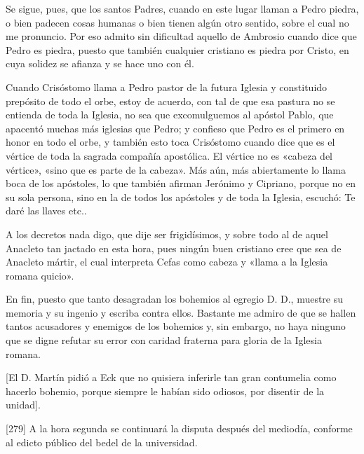 Se sigue, pues, que los santos Padres, cuando en este lugar llaman a Pedro piedra, o bien padecen cosas humanas o bien tienen algún otro sentido, sobre el cual no me pronuncio. Por eso admito sin dificultad aquello de Ambrosio cuando dice que Pedro es piedra, puesto que también cualquier cristiano es piedra por Cristo, en cuya solidez se afianza y se hace uno con él.

Cuando Crisóstomo llama a Pedro pastor de la futura Iglesia y constituido prepósito de todo el orbe, estoy de acuerdo, con tal de que esa pastura no se entienda de toda la Iglesia, no sea que excomulguemos al apóstol Pablo, que apacentó muchas más iglesias que Pedro; y confieso que Pedro es el primero en honor en todo el orbe, y también esto toca Crisóstomo cuando dice que es el vértice de toda la sagrada compañía apostólica. El vértice no es «cabeza del vértice», «sino que es parte de la cabeza». Más aún, más abiertamente lo llama boca de los apóstoles, lo que también afirman Jerónimo y Cipriano, porque no en su sola persona, sino en la de todos los apóstoles y de toda la Iglesia, escuchó: Te daré las llaves etc..

A los decretos nada digo, que dije ser frigidísimos, y sobre todo al de aquel Anacleto tan jactado en esta hora, pues ningún buen cristiano cree que sea de Anacleto mártir, el cual interpreta Cefas como cabeza y «llama a la Iglesia romana quicio».

En fin, puesto que tanto desagradan los bohemios al egregio D. D., muestre su memoria y su ingenio y escriba contra ellos. Bastante me admiro de que se hallen tantos acusadores y enemigos de los bohemios y, sin embargo, no haya ninguno que se digne refutar su error con caridad fraterna para gloria de la Iglesia romana.

[El D. Martín pidió a Eck que no quisiera inferirle tan gran contumelia como hacerlo bohemio, porque siempre le habían sido odiosos, por disentir de la unidad].

[279] A la hora segunda se continuará la disputa después del mediodía, conforme al edicto público del bedel de la universidad.

